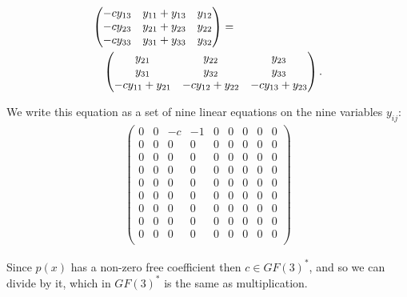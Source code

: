 \documentclass[11pt]{article} \usepackage{amssymb}
\begin{document}
\begin{enumerate}
\begin{enumerate}
\begin{itemize}
        \begin{eqnarray*}
          \lefteqn{
            \begin{pmatrix}
              -cy_{13}&y_{11}+y_{13}  &y_{12} \\ 
              -cy_{23}&y_{21}+y_{23}  &y_{22} \\ 
              -cy_{33}&y_{31}+y_{33}  &y_{32} 
            \end{pmatrix}
            =}
          \\
          &&
          \begin{pmatrix}
            y_{21}&y_{22}  &y_{23} \\ 
            y_{31}&y_{32}  &y_{33} \\ 
            -cy_{11}+y_{21}&-cy_{12}+y_{22}&-cy_{13}+y_{23}
          \end{pmatrix}.
        \end{eqnarray*}

        We write this equation as a set of nine linear equations on the nine
        variables $y_{ij}$:
        \begin{eqnarray*}
          \begin{pmatrix}
            0& 0& -c& -1& 0& 0& 0& 0& 0 \\
            0& 0& 0& 0& 0& 0& 0& 0& 0 \\
            0& 0& 0& 0& 0& 0& 0& 0& 0 \\
            0& 0& 0& 0& 0& 0& 0& 0& 0 \\
            0& 0& 0& 0& 0& 0& 0& 0& 0 \\
            0& 0& 0& 0& 0& 0& 0& 0& 0 \\
            0& 0& 0& 0& 0& 0& 0& 0& 0 \\
            0& 0& 0& 0& 0& 0& 0& 0& 0 \\
            0& 0& 0& 0& 0& 0& 0& 0& 0 \\
          \end{pmatrix}
        \end{eqnarray*}
        
        Since $p(x)$ has a non-zero free coefficient then $c\in GF(3)^*$, and so
        we can divide by it, which in $GF(3)^*$ is the same as multiplication.


\end{itemize}
\end{enumerate}
\end{enumerate}
\end{document}
